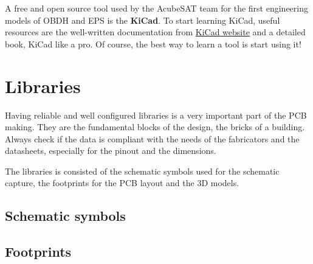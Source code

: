 \documentclass[12pt]{article}
\begin{document}
A free and open source tool used by the AcubeSAT team for the first engineering models of OBDH and EPS is the \textbf{KiCad}. To start learning KiCad, useful resources are the well-written documentation from \href{http://docs.kicad-pcb.org/}{KiCad website} and a detailed book, KiCad like a pro. Of course, the best way to learn a tool is start using it!

\section{Libraries}

Having reliable and well configured libraries is a very important part of the PCB making. They are the fundamental blocks of the design, the bricks of a building. Always check if the data is compliant with the needs of the fabricators and the datasheets, especially for the pinout and the dimensions.

The libraries is consisted of the schematic symbols used for the schematic capture, the footprints for the PCB layout and the 3D models.

\subsection{Schematic symbols}

\subsection{Footprints}


\end{document}
